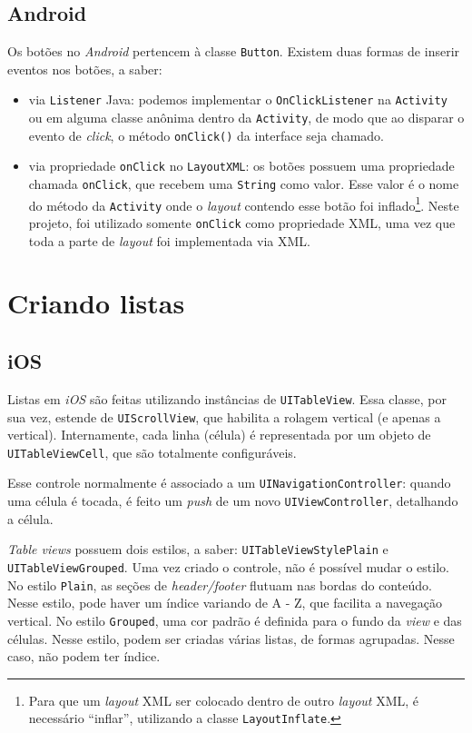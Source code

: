     \subsection{Android}
     
    Os botões no \emph{Android} pertencem à classe \texttt{Button}. Existem duas formas de inserir eventos nos botões, a saber:
\begin{itemize}
\item via \texttt{Listener} Java: podemos implementar o \texttt{OnClickListener} na \texttt{Activity} ou em alguma classe anônima dentro da \texttt{Activity}, de modo que ao disparar o evento de \emph{click}, o método \texttt{onClick()} da interface seja chamado.
\item via propriedade \texttt{onClick} no \texttt{LayoutXML}: os botões possuem uma propriedade chamada \texttt{onClick}, que recebem uma \texttt{String} como valor. Esse valor é o nome do método da \texttt{Activity} onde o \emph{layout} contendo esse botão foi inflado\footnote{Para que um \emph{layout} \ac{XML} ser colocado dentro de outro \emph{layout} \ac{XML}, é necessário ``inflar'', utilizando a classe \texttt{LayoutInflate}.}.
    Neste projeto, foi utilizado somente \texttt{onClick} como propriedade \ac{XML}, uma vez que toda a parte de \emph{layout} foi implementada via \ac{XML}.
\end{itemize}    
    \section {Criando listas}
    \subsection{iOS}
     
    Listas em \emph{iOS} são feitas utilizando instâncias de \texttt{UITableView}. Essa classe, por sua vez, estende de \texttt{UIScrollView}, que habilita a rolagem vertical (e apenas a vertical). Internamente, cada linha (célula) é representada por um objeto de \texttt{UITableViewCell}, que são totalmente configuráveis.
    
	Esse controle normalmente é associado a um \texttt{UINavigationController}: quando uma célula é tocada, é feito um \emph{push} de um novo \texttt{UIViewController}, detalhando a célula.
    
	\emph{Table views} possuem dois estilos, a saber: \texttt{UITableViewStylePlain} e \texttt{UITableViewGrouped}. Uma vez criado o controle, não é possível mudar o estilo. No estilo \texttt{Plain}, as seções de \emph{header/footer} flutuam nas bordas do conteúdo. Nesse estilo, pode haver um índice variando de A - Z, que facilita a navegação vertical. No estilo \texttt{Grouped}, uma cor padrão é definida para o fundo da \emph{view} e das células. Nesse estilo, podem ser criadas várias listas, de formas agrupadas. Nesse caso, não podem ter índice.
    
